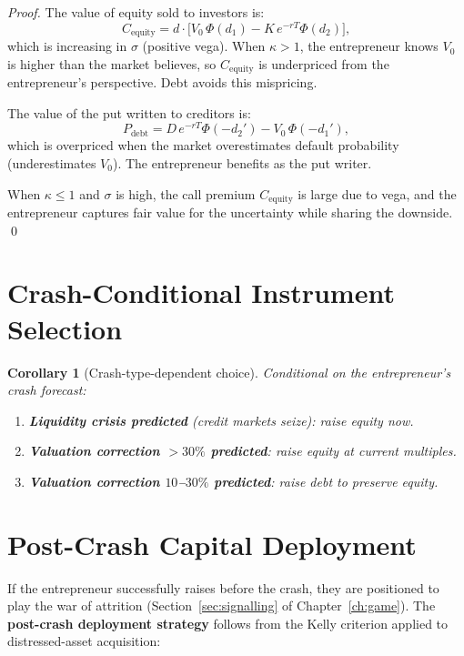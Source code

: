 \documentclass[12pt,a4paper,oneside]{book}
\newtheorem{corollary}[theorem]{Corollary}
\theoremstyle{definition}
\theoremstyle{remark}
\begin{document}
\begin{proof}
The value of equity sold to investors is:
\begin{equation}\label{eq:call_value}
  C_{\text{equity}} = d \cdot \bigl[V_0\,\Phi(d_1) - K\,e^{-rT}\Phi(d_2)\bigr],
\end{equation}
which is increasing in $\sigma$ (positive vega). When $\kappa > 1$, the entrepreneur
knows $V_0$ is higher than the market believes, so $C_{\text{equity}}$ is underpriced
from the entrepreneur's perspective. Debt avoids this mispricing.

The value of the put written to creditors is:
\begin{equation}\label{eq:put_value}
  P_{\text{debt}} = D\,e^{-rT}\Phi(-d_2') - V_0\,\Phi(-d_1'),
\end{equation}
which is overpriced when the market overestimates default probability (underestimates
$V_0$). The entrepreneur benefits as the put writer.

When $\kappa \leq 1$ and $\sigma$ is high, the call premium $C_{\text{equity}}$ is large
due to vega, and the entrepreneur captures fair value for the uncertainty while sharing
the downside. \qed
\end{proof}

\section{Crash-Conditional Instrument Selection}

\begin{corollary}[Crash-type-dependent choice]\label{cor:crash_type}
Conditional on the entrepreneur's crash forecast:
\begin{enumerate}[nosep]
  \item \textbf{Liquidity crisis predicted} (credit markets seize): raise equity now.
  \item \textbf{Valuation correction $> 30\%$ predicted}: raise equity at current multiples.
  \item \textbf{Valuation correction $10$--$30\%$ predicted}: raise debt to preserve equity.
\end{enumerate}
\end{corollary}

\section{Post-Crash Capital Deployment}

If the entrepreneur successfully raises before the crash, they are positioned to play
the war of attrition (Section~\ref{sec:signalling} of Chapter~\ref{ch:game}). The
\textbf{post-crash deployment strategy} follows from the Kelly criterion applied to
distressed-asset acquisition:
\end{document}
